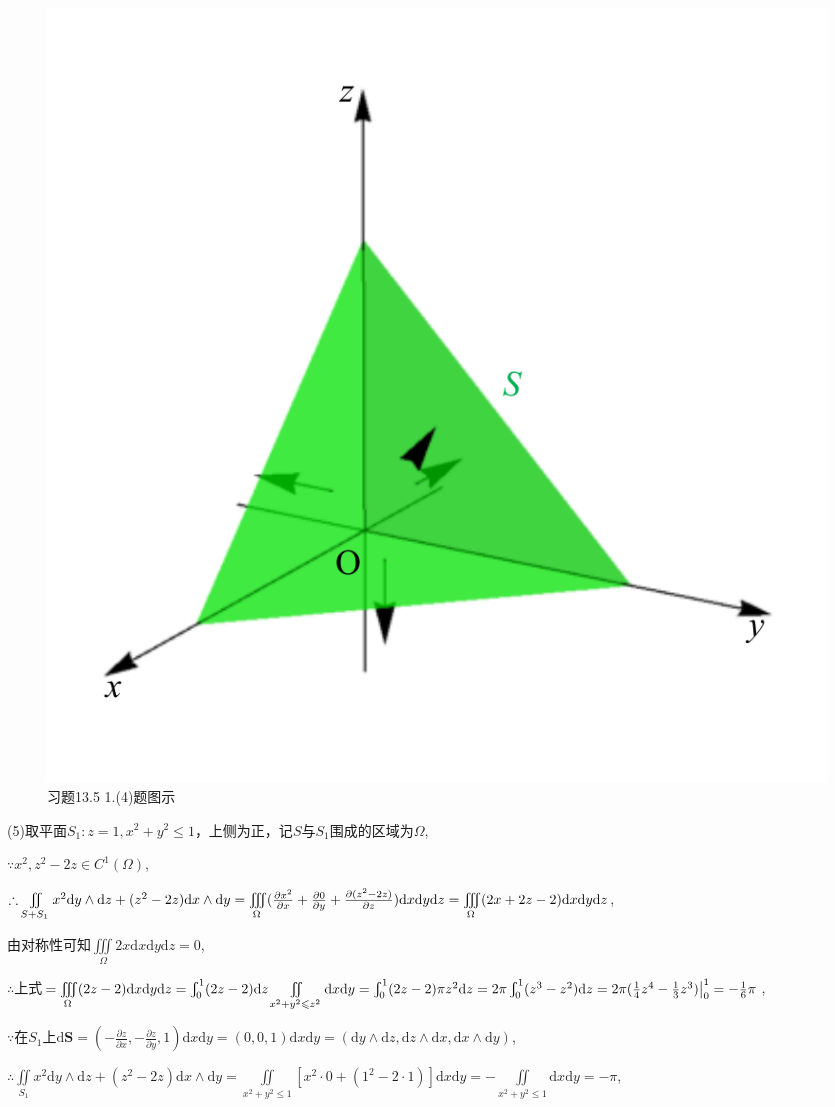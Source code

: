 \documentclass[12pt,UTF8]{ctexart}
\newcommand{\Int}[4]{\varint\nolimits_{#1}^{#2}#3\mathrm d#4}
\newcommand{\varIInt}[4]{\iint\limits_{#1}#2\mathrm d#3\mathrm d#4}
\newcommand{\varIIInt}[5]{\iiint\limits_{#1}#2\mathrm d#3\mathrm d#4\mathrm d#5}
\newcommand{\md}[1]{\mathrm d#1}
\newcommand{\BSIInt}[2]{\iint\limits_{#1}#2}
\newcommand{\pp}[2]{\frac{\partial #1}{\partial #2}}
\begin{document}
\begin{enumerate}
\begin{figure}[H]
\begin{center}
\includegraphics[height=0.5\textheight]{Figures24/Fig13-5-1-4.pdf}
\end{center}
\caption{习题13.5 1.(4)题图示}
\label{13-5-1-4}
\end{figure}

(5)取平面$S_1:z=1,x^2+y^2\leqslant1$，上侧为正，记$S$与$S_1$围成的区域为$\Omega$,

$\because x^2,z^2-2z\in C^1(\Omega)$,

$\therefore\BSIInt{S+S_1}{x^2\md y\wedge\md z+(z^2-2z)\md x\wedge\md y}=\varIIInt\Omega{(\pp{x^2}x+\pp0y+\pp{(z^2-2z)}z)}xyz\\
=\varIIInt\Omega{(2x+2z-2)}xyz$,

由对称性可知$\varIIInt\Omega{2x}xyz=0$,

$\therefore$上式$=\varIIInt\Omega{(2z-2)}xyz=\Int01{(2z-2)}z\varIInt{x^2+y^2\leqslant z^2}{}xy=\Int01{(2z-2)\pi z^2}z\\
=2\pi\Int01{(z^3-z^2)}z=2\pi(\frac14z^4-\frac13z^3)\big|_0^1=-\frac16\pi$,

$\because$在$S_1$上$\md\bm S=(-\pp zx,-\pp zy,1)\md x\md y=(0,0,1)\md x\md y=(\md y\wedge\md z,\md z\wedge\md x,\md x\wedge\md y)$,

$\therefore\BSIInt{S_1}{x^2\md y\wedge\md z+(z^2-2z)\md x\wedge\md y}=\varIInt{x^2+y^2\leqslant1}{[x^2\cdot0+(1^2-2\cdot1)]}xy=-\varIInt{x^2+y^2\leqslant1}{}xy=-\pi$,


\end{enumerate}
\end{document}
